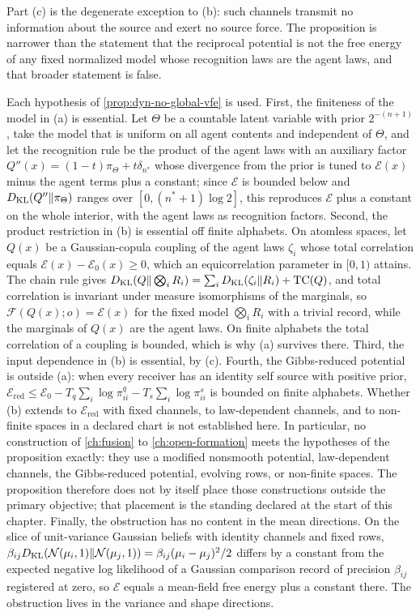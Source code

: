 Part (c) is the degenerate exception to (b): such channels transmit no information about the source and exert no source force. The proposition is narrower than the statement that the reciprocal potential is not the free energy of any fixed normalized model whose recognition laws are the agent laws, and that broader statement is false.

Each hypothesis of \cref{prop:dyn-no-global-vfe} is used. First, the finiteness of the model in (a) is essential. Let $\Theta$ be a countable latent variable with prior $2^{-(n+1)}$, take the model that is uniform on all agent contents and independent of $\Theta$, and let the recognition rule be the product of the agent laws with an auxiliary factor $Q''(x)=(1-t)\pi_\Theta+t\delta_{n^*}$ whose divergence from the prior is tuned to $\mathcal E(x)$ minus the agent terms plus a constant; since $\mathcal E$ is bounded below and $D_{\mathrm{KL}}(Q''\Vert\pi_\Theta)$ ranges over $[0,(n^*+1)\log2]$, this reproduces $\mathcal E$ plus a constant on the whole interior, with the agent laws as recognition factors. Second, the product restriction in (b) is essential off finite alphabets. On atomless spaces, let $Q(x)$ be a Gaussian-copula coupling of the agent laws $\zeta_i$ whose total correlation equals $\mathcal E(x)-\mathcal E_0(x)\geq0$, which an equicorrelation parameter in $[0,1)$ attains. The chain rule gives $D_{\mathrm{KL}}(Q\Vert\bigotimes_iR_i)=\sum_iD_{\mathrm{KL}}(\zeta_i\Vert R_i)+\operatorname{TC}(Q)$, and total correlation is invariant under measure isomorphisms of the marginals, so $\mathcal F(Q(x);o)=\mathcal E(x)$ for the fixed model $\bigotimes_iR_i$ with a trivial record, while the marginals of $Q(x)$ are the agent laws. On finite alphabets the total correlation of a coupling is bounded, which is why (a) survives there. Third, the input dependence in (b) is essential, by (c). Fourth, the Gibbs-reduced potential is outside (a): when every receiver has an identity self source with positive prior, $\mathcal E_{\mathrm{red}}\leq\mathcal E_0-T_q\sum_i\log\pi^q_{ii}-T_s\sum_i\log\pi^s_{ii}$ is bounded on finite alphabets. Whether (b) extends to $\mathcal E_{\mathrm{red}}$ with fixed channels, to law-dependent channels, and to non-finite spaces in a declared chart is not established here. In particular, no construction of \cref{ch:fusion} to \cref{ch:open-formation} meets the hypotheses of the proposition exactly: they use a modified nonsmooth potential, law-dependent channels, the Gibbs-reduced potential, evolving rows, or non-finite spaces. The proposition therefore does not by itself place those constructions outside the primary objective; that placement is the standing declared at the start of this chapter. Finally, the obstruction has no content in the mean directions. On the slice of unit-variance Gaussian beliefs with identity channels and fixed rows, $\beta_{ij}D_{\mathrm{KL}}(\mathcal N(\mu_i,1)\Vert\mathcal N(\mu_j,1))=\beta_{ij}(\mu_i-\mu_j)^2/2$ differs by a constant from the expected negative log likelihood of a Gaussian comparison record of precision $\beta_{ij}$ registered at zero, so $\mathcal E$ equals a mean-field free energy plus a constant there. The obstruction lives in the variance and shape directions.

